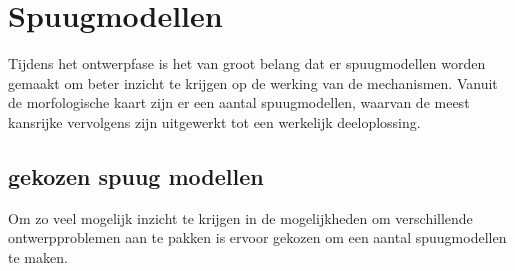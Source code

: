 \section{Spuugmodellen}
\label{se:Spuugmodellen}
\vspace{\baselineskip}
Tijdens het ontwerpfase is het van groot belang dat er spuugmodellen worden gemaakt om beter inzicht te krijgen op de werking van de mechanismen. Vanuit de morfologische kaart zijn er een aantal spuugmodellen, waarvan de meest kansrijke vervolgens zijn uitgewerkt tot een werkelijk deeloplossing. 
\subsection{gekozen spuug modellen}
\vspace{\baselineskip}

{Om zo veel mogelijk inzicht te krijgen in de mogelijkheden om verschillende ontwerpproblemen aan te pakken is ervoor gekozen om een aantal spuugmodellen te maken.} \\

